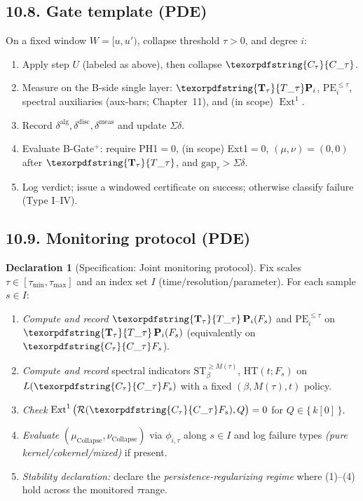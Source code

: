 \documentclass[11pt]{article}
\numberwithin{equation}{section}
\theoremstyle{plain}
\theoremstyle{definition}
\theoremstyle{remark}
\DeclareMathOperator{\Ext}{Ext}
\DeclareRobustCommand{\hyp}{\nobreakdash-}
\newcommand{\Rfun}{\mathcal{R}}
\theoremstyle{plain}
\theoremstyle{definition}
\numberwithin{equation}{section}
\theoremstyle{definition}
\newtheorem{declaration}[theorem]{Declaration}
\DeclareRobustCommand{\Ttau}{\texorpdfstring{\ensuremath{\mathbf{T}_{\tau}}}{T\_\tau}}
\DeclareRobustCommand{\Ctau}{\texorpdfstring{\ensuremath{C_{\tau}}}{C\_\tau}}
\DeclareRobustCommand{\muc}{\mu_{\mathrm{Collapse}}}
\DeclareRobustCommand{\nuc}{\nu_{\mathrm{Collapse}}}
\DeclareRobustCommand{\Qtest}{\{\,k[0]\,\}}
\numberwithin{equation}{section}
\theoremstyle{plain}
\theoremstyle{definition}
\theoremstyle{remark}
\providecommand{\Cfun}[1]{\mathsf{C}_{#1}}
\providecommand{\Tfun}[1]{\mathbf{T}_{#1}}
\providecommand{\Ctau}{\Cfun{\tau}}
\providecommand{\Ttau}{\Tfun{\tau}}
\providecommand{\muc}{\mu_{\mathrm{Collapse}}}
\providecommand{\nuc}{\nu_{\mathrm{Collapse}}}
\begin{document}
\subsection*{10.8. Gate template (PDE)}
On a fixed window \(W=[u,u')\), collapse threshold \(\tau>0\), and degree \(i\):
\begin{enumerate}
  \item Apply step \(U\) (labeled as above), then collapse \(\Ctau\).
  \item Measure on the B\hyp side single layer: \(\Ttau\mathbf{P}_i\), \(\mathrm{PE}_i^{\le\tau}\), spectral auxiliaries (aux\hyp bars; Chapter~11), and (in scope) \(\Ext^1\).
  \item Record \(\delta^{\mathrm{alg}},\delta^{\mathrm{disc}},\delta^{\mathrm{meas}}\) and update \(\Sigma\delta\).
  \item Evaluate B\hyp Gate\(^{+}\): require PH1\(=0\), (in scope) Ext1\(=0\), \((\mu,\nu)=(0,0)\) after \(\Ttau\), and \(\mathrm{gap}_\tau>\Sigma\delta\).
  \item Log verdict; issue a windowed certificate on success; otherwise classify failure (Type I–IV).
\end{enumerate}

\subsection*{10.9. Monitoring protocol (PDE)}
\begin{declaration}[Specification: Joint monitoring protocol]\label{spec:10-protocol}
Fix scales \(\tau\in[\tau_{\min},\tau_{\max}]\) and an index set \(I\) (time/resolution/parameter).
For each sample \(s\in I\):
\begin{enumerate}
  \item \emph{Compute and record} \(\Ttau\,\mathbf{P}_i(F_s)\) and \(\mathrm{PE}_i^{\le \tau}\) on \(\Ttau\,\mathbf{P}_i(F_s)\) (equivalently on \(\Ctau F_s\)).
  \item \emph{Compute and record} spectral indicators \(\mathrm{ST}_\beta^{\ge M(\tau)}\), \(\mathrm{HT}(t;F_s)\) on \(L(\Ctau F_s)\) with a fixed \((\beta,M(\tau),t)\) policy.
  \item \emph{Check} \(\Ext^1\big(\Rfun(\Ctau F_s),Q\big)=0\) for \(Q\in\Qtest\).
  \item \emph{Evaluate} \((\muc,\nuc)\) via \(\phi_{i,\tau}\) along \(s\in I\) and log failure types \emph{(pure kernel/cokernel/mixed)} if present.
  \item \emph{Stability declaration:} declare the \emph{persistence\hyp regularizing regime} where (1)–(4) hold across the monitored \(\tau\)\nobreakdash range.
\end{enumerate}
\end{declaration}
\end{document}
